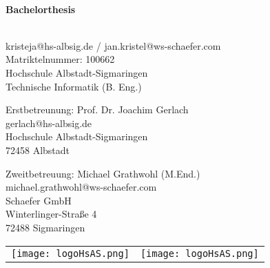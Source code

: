 \documentclass[
	ngerman,
	a4paper,
	oneside
]{scrbook}
\begin{document}
\begin{titlepage}
	\begin{center}
	\vspace*{1cm}
		{\Huge\bfseries\doctitle\\[1em]\large Bachelorthesis}
	\vspace{1cm}
		\date{\today} %
		
		\docauthor\\
		kristeja@hs-albsig.de / jan.kristel@ws-schaefer.com\\
		Matriktelnummer: 100662\\
		Hochschule Albstadt-Sigmaringen\\
		Technische Informatik (B. Eng.)\\
		
\vspace{8mm}

		Erstbetreunung: Prof. Dr. Joachim Gerlach\\
		gerlach@hs-albsig.de\\
		Hochschule Albstadt-Sigmaringen\\
		72458 Albstadt
		
\vspace{8mm}

		Zweitbetreuung: Michael Grathwohl (M.End.)\\
		michael.grathwohl@ws-schaefer.com\\
		Schaefer GmbH\\
		Winterlinger-Straße 4\\
		72488 Sigmaringen
	\end{center}

\vspace{8mm}


	\begin{tabular}{ ll }
		\texttt{[image: logoHsAS.png]}
		&
   		\texttt{[image: logoHsAS.png]}
	\end{tabular}

	

\end{titlepage}
\end{document}
